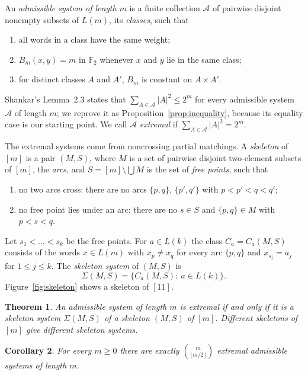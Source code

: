 \documentclass[11pt]{amsart}
\newtheorem{theorem}{Theorem}[section]
\newtheorem{corollary}[theorem]{Corollary}
\theoremstyle{definition}
\theoremstyle{remark}
\numberwithin{equation}{section}
\newcommand{\F}{\mathbb{F}}
\newcommand{\cA}{\mathcal{A}}
\begin{document}
An \emph{admissible system of length $m$} is a finite collection $\cA$ of pairwise disjoint nonempty subsets of $L(m)$, its \emph{classes}, such that
\begin{enumerate}[label=\textup{(A\arabic*)}]
\item all words in a class have the same weight;
\item $B_m(x,y)=m$ in $\F_2$ whenever $x$ and $y$ lie in the same class;
\item for distinct classes $A$ and $A'$, $B_m$ is constant on $A\times A'$.
\end{enumerate}

Shankar's Lemma~2.3 states that $\sum_{A\in\cA}|A|^2\le 2^m$ for every admissible system $\cA$ of length $m$; we reprove it as Proposition~\ref{prop:inequality}, because its equality case is our starting point. We call $\cA$ \emph{extremal} if $\sum_{A\in\cA}|A|^2=2^m$.

The extremal systems come from noncrossing partial matchings. A \emph{skeleton} of $[m]$ is a pair $(M,S)$, where $M$ is a set of pairwise disjoint two-element subsets of $[m]$, the \emph{arcs}, and $S=[m]\setminus\bigcup M$ is the set of \emph{free points}, such that
\begin{enumerate}[label=(\alph*)]
\item no two arcs cross: there are no arcs $\{p,q\}$, $\{p',q'\}$ with $p<p'<q<q'$;
\item no free point lies under an arc: there are no $s\in S$ and $\{p,q\}\in M$ with $p<s<q$.
\end{enumerate}
Let $s_1<\dots<s_k$ be the free points. For $a\in L(k)$ the class $C_a=C_a(M,S)$ consists of the words $x\in L(m)$ with $x_p\ne x_q$ for every arc $\{p,q\}$ and $x_{s_j}=a_j$ for $1\le j\le k$. The \emph{skeleton system} of $(M,S)$ is
\[
\Sigma(M,S)=\{C_a(M,S):\ a\in L(k)\}.
\]
Figure~\ref{fig:skeleton} shows a skeleton of $[11]$.

\begin{theorem}\label{thm:main}
An admissible system of length $m$ is extremal if and only if it is a skeleton system $\Sigma(M,S)$ of a skeleton $(M,S)$ of $[m]$. Different skeletons of $[m]$ give different skeleton systems.
\end{theorem}

\begin{corollary}\label{cor:count}
For every $m\ge0$ there are exactly $\binom{m}{\lfloor m/2\rfloor}$ extremal admissible systems of length $m$.
\end{corollary}
\end{document}
